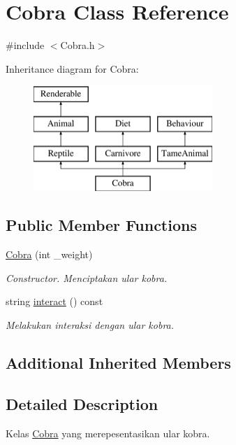 \hypertarget{classCobra}{\section{Cobra Class Reference}
\label{classCobra}
}


{\ttfamily \#include $<$Cobra.\+h$>$}

Inheritance diagram for Cobra\+:\begin{figure}[H]
\begin{center}
\leavevmode
\includegraphics[height=4.000000cm]{classCobra}
\end{center}
\end{figure}
\subsection*{Public Member Functions}
\begin{DoxyCompactItemize}
\item 
\hypertarget{classCobra_afe3610c43386878eb1f80277933a20d0}{\hyperlink{classCobra_afe3610c43386878eb1f80277933a20d0}{Cobra} (int \+\_\+weight)}\label{classCobra_afe3610c43386878eb1f80277933a20d0}

\begin{DoxyCompactList}\small\item\em Constructor. Menciptakan ular kobra. \end{DoxyCompactList}\item 
string \hyperlink{classCobra_a4d93bcdfc9811547e3418818bec32585}{interact} () const 
\begin{DoxyCompactList}\small\item\em Melakukan interaksi dengan ular kobra. \end{DoxyCompactList}\end{DoxyCompactItemize}
\subsection*{Additional Inherited Members}


\subsection{Detailed Description}
Kelas \hyperlink{classCobra}{Cobra} yang merepesentasikan ular kobra. 

